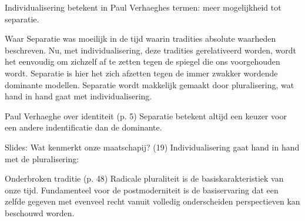 \documentclass[main.tex]{subfiles}
\begin{document}
\begin{examenvraag}
    \begin{stelling}
        Individualisering betekent in Paul Verhaeghes termen: meer mogelijkheid tot separatie.
    \end{stelling}

    \begin{stelling-antwoord}{Waar}
        Separatie was moeilijk in de tijd waarin tradities absolute waarheden beschreven.
        Nu, met individualisering, deze tradities gerelativeerd worden, wordt het eenvoudig om zichzelf af te zetten tegen de spiegel die ons voorgehouden wordt.
        Separatie is hier het zich afzetten tegen de immer zwakker wordende dominante modellen.
        Separatie wordt makkelijk gemaakt door pluralisering, wat hand in hand gaat met individualisering.
        \begin{citaat}{Paul Verhaeghe over identiteit (p. 5)}
            Separatie betekent altijd een keuzer voor een andere indentificatie dan de dominante.
        \end{citaat}
        \begin{citaat}{Slides: Wat kenmerkt onze maatschapij? (19)}
            Individualisering gaat hand in hand met de pluralisering:
        \end{citaat}
        \begin{citaat}{Onderbroken traditie (p. 48)}
            Radicale pluraliteit is de basiskarakteristiek van onze tijd.
            Fundamenteel voor de postmoderniteit is de basiservaring dat een zelfde gegeven met evenveel recht vanuit volledig onderscheiden perspectieven kan beschouwd worden.
        \end{citaat}
    \end{stelling-antwoord}
\end{examenvraag}
\end{document}
